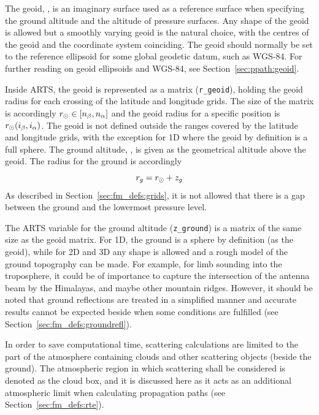 \label{sec:fm_defs:geoid}

The geoid, \aRds{\odot}, is an imaginary surface used as a reference
surface when specifying the ground altitude and the altitude of
pressure surfaces. Any shape of the geoid is allowed but a smoothly
varying geoid is the natural choice, with the centres of the geoid and
the coordinate system coinciding. The geoid should normally be set to
the reference ellipsoid for some global geodetic datum, such as
WGS-84. For further reading on geoid ellipsoids and WGS-84, see
Section~\ref{sec:ppath:geoid}.

Inside ARTS, the geoid is represented as a matrix (\verb|r_geoid|),
holding the geoid radius for each crossing of the latitude and
longitude grids. The size of the matrix is accordingly $r_{\odot}
\in [n_{\beta},n_{\alpha}]$ and the geoid radius for a
specific position is $r_{\odot}(i_{\beta},i_{\alpha})$. The
geoid is not defined outside the ranges covered by the latitude and
longitude grids, with the exception for 1D where the geoid by
definition is a full sphere. 
The ground altitude, , is given as the geometrical altitude
above the geoid. The radius for the ground is accordingly
\begin{equation}
  r_{g} = r_{\odot} + z_{g}
 \label{eq:fm_defs:zground}
\end{equation}
As described in
Section~\ref{sec:fm_defs:grids}, it is not allowed that there is a gap
between the ground and the lowermost pressure level.

The ARTS variable for the ground altitude (\verb|z_ground|) is a
matrix of the same size as the geoid matrix.  For 1D, the ground is a
sphere by definition (as the geoid), while for 2D and 3D any shape is
allowed and a rough model of the ground topography can be made. For
example, for limb sounding into the troposphere, it could be of
importance to capture the intersection of the antenna beam by the
Himalayas, and maybe other mountain ridges.  However, it should be
noted that ground reflections are treated in a simplified manner and
accurate results cannot be expected beside when some conditions are
fulfilled (see Section~\ref{sec:fm_defs:groundrefl}).


\label{sec:fm_defs:cloudbox}

In order to save computational time, scattering calculations are
limited to the part of the atmosphere containing clouds and other
scattering objects (beside the ground). The atmospheric region in
which scattering shall be considered is denoted as the cloud box, and
it is discussed here as it acts as an additional atmospheric limit
when calculating propagation paths (see Section~\ref{sec:fm_defs:rte}). 

